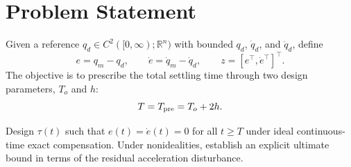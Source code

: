 \section{Problem Statement}\label{sec:problem}
Given a reference $q_d\in C^2([0,\infty);\mathbb R^n)$ with bounded
$q_d$, $\dot q_d$, and $\ddot q_d$, define
\begin{equation}
 e=q_m-q_d,\qquad \dot e=\dot q_m-\dot q_d,\qquad
 z=[e^\top,\dot e^\top]^\top.
 \label{eq:tracking_errors}
\end{equation}
The objective is to prescribe the total settling time through two design
parameters, $T_o$ and $h$:
\begin{equation}
 T=T_{\rm pre}=T_o+2h.
 \label{eq:prescribed_time_definition}
\end{equation}
\begin{problem}\label{prob:tracking}
Design $\tau(t)$ such that $e(t)=\dot e(t)=0$ for all $t\geq T$ under
ideal continuous-time exact compensation. Under nonidealities, establish an
explicit ultimate bound in terms of the residual acceleration disturbance.
\end{problem}

